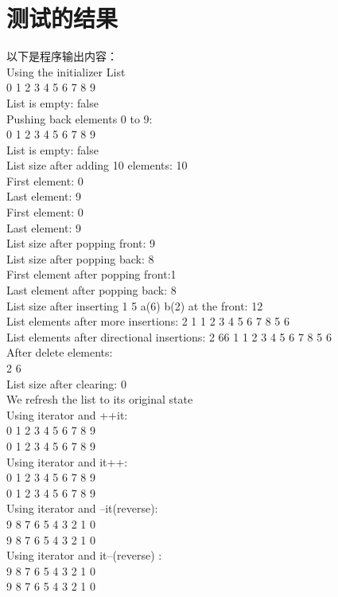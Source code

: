 \documentclass[UTF8]{ctexart}
\begin{document}
\section{测试的结果}
以下是程序输出内容：\\
Using the initializer List\\
0 1 2 3 4 5 6 7 8 9 \\
List is empty: false\\
Pushing back elements 0 to 9:\\
0 1 2 3 4 5 6 7 8 9 \\
List is empty: false\\
List size after adding 10 elements: 10\\
First element: 0\\
Last element: 9\\
First element: 0\\
Last element: 9\\
List size after popping front: 9\\
List size after popping back: 8\\
First element after popping front:1\\
Last element after popping back: 8\\
List size after inserting 1 5 a(6) b(2) at the front: 12\\
List elements after more insertions: 2 1 1 2 3 4 5 6 7 8 5 6 \\
List elements after directional insertions: 2 66 1 1 2 3 4 5 6 7 8 5 6 \\
After delete elements:\\
2 6 \\
List size after clearing: 0\\
We refresh the list to its original state\\
Using iterator and ++it:\\
0 1 2 3 4 5 6 7 8 9\\
0 1 2 3 4 5 6 7 8 9 \\
Using iterator and it++:\\
0 1 2 3 4 5 6 7 8 9 \\
0 1 2 3 4 5 6 7 8 9 \\
Using iterator and --it(reverse):\\
9 8 7 6 5 4 3 2 1 0\\
9 8 7 6 5 4 3 2 1 0\\
Using iterator and it--(reverse) :\\
9 8 7 6 5 4 3 2 1 0\\
9 8 7 6 5 4 3 2 1 0\\
\end{document}
